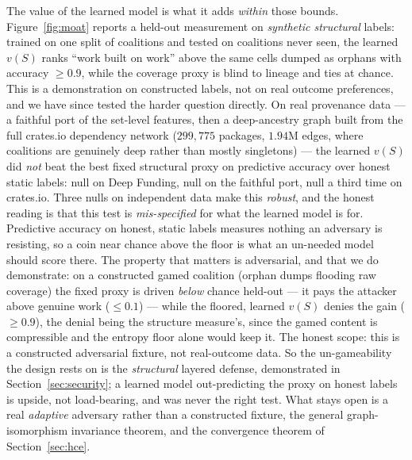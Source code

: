 \documentclass[10pt]{article}
\begin{document}
The value of the learned model is what it adds \emph{within} those bounds. Figure~\ref{fig:moat}
reports a held-out measurement on \emph{synthetic structural} labels: trained on one split of
coalitions and tested on coalitions never seen, the learned $v(S)$ ranks ``work built on work'' above
the same cells dumped as orphans with accuracy $\ge 0.9$, while the coverage proxy is blind to lineage
and ties at chance. This is a demonstration on constructed labels, not on real outcome preferences, and we have since
tested the harder question directly. On real provenance data --- a faithful port of the set-level
features, then a deep-ancestry graph built from the full crates.io dependency network ($299{,}775$
packages, $1.94$M edges, where coalitions are genuinely deep rather than mostly singletons) --- the
learned $v(S)$ did \emph{not} beat the best fixed structural proxy on predictive accuracy over honest
static labels: null on Deep Funding, null on the faithful port, null a third time on crates.io. Three
nulls on independent data make this \emph{robust}, and the honest reading is that this test is
\emph{mis-specified} for what the learned model is for. Predictive accuracy on honest, static labels
measures nothing an adversary is resisting, so a coin near chance above the floor is what an un-needed
model should score there. The property that matters is adversarial, and that we do demonstrate: on a
constructed gamed coalition (orphan dumps flooding raw coverage) the fixed proxy is driven \emph{below}
chance held-out --- it pays the attacker above genuine work ($\le 0.1$) --- while the floored, learned
$v(S)$ denies the gain ($\ge 0.9$), the denial being the structure measure's, since the gamed content
is compressible and the entropy floor alone would keep it. The honest scope: this is a constructed
adversarial fixture, not real-outcome data. So the un-gameability the design rests on is the
\emph{structural} layered defense, demonstrated in Section~\ref{sec:security}; a learned model
out-predicting the proxy on honest labels is upside, not load-bearing, and was never the right test.
What stays open is a real \emph{adaptive} adversary rather than a constructed fixture, the general
graph-isomorphism invariance theorem, and the convergence theorem of Section~\ref{sec:hce}.
\end{document}
